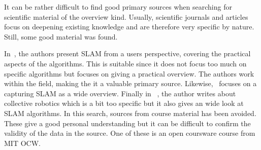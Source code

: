 It can be rather difficult to find good primary sources when searching for
scientific material of the overview kind. Usually, scientific journals and
articles focus on deepening existing knowledge and are therefore very specific
by nature. Still, some good material was found.

In~\cite{Frese2010}, the authors present SLAM from a users perspective, covering
the practical aspects of the algorithms. This is suitable since it does not
focus too much on specific algorithms but focuses on giving a practical
overview. The authors work within the field, making the it a valuable primary
source. Likewise,~\cite{5769022} focuses on a capturing SLAM as a wide overview.
Finally in ~\cite{Kernbach20131}, the author writes about collective robotics
which is a bit too specific but it also gives an wide look at SLAM algorithms.
In this search, sources from course material has been avoided. These give a good
personal understanding but it can be difficult to confirm the validity of the
data in the source. One of these is an open coursware course from MIT OCW.
